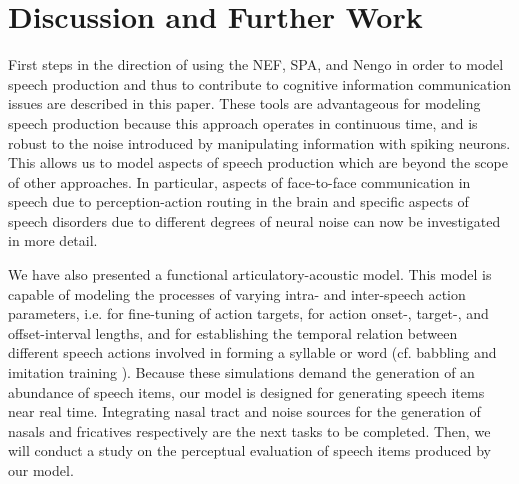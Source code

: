 \documentclass[conference]{IEEEtran}
\begin{document}
\section{Discussion and Further Work}

First steps in the direction of using the NEF, SPA, and Nengo
in order to model speech production and thus to contribute
to cognitive information communication issues
\cite{Baranyi2012} are
described in this paper. These tools are advantageous
for modeling speech production because this
approach operates in continuous time, and is robust to the
noise introduced by manipulating information with spiking neurons.
This allows us to model aspects of speech production
which are beyond the scope of other approaches. In particular,
aspects of face-to-face communication in speech due to
perception-action routing in the brain and specific aspects of speech
disorders due to different degrees of neural noise
can now be investigated in more detail.

We have also presented a functional articulatory-acoustic model.
This model is capable of modeling the processes of varying
intra- and inter-speech action parameters, i.e. for fine-tuning of
action targets, for action onset-, target-, and offset-interval
lengths, and for establishing the temporal relation between
different speech actions involved in
forming a syllable or word (cf. babbling and
imitation training \cite{kroger2009,kroger2014}). Because these
simulations demand the generation of an abundance of speech items,
our model is designed for generating speech items near real time.
Integrating nasal tract and noise sources for the generation of nasals
and fricatives respectively are the next tasks to be completed.
Then, we will conduct a study on the perceptual evaluation
of speech items produced by our model.




\end{document}
